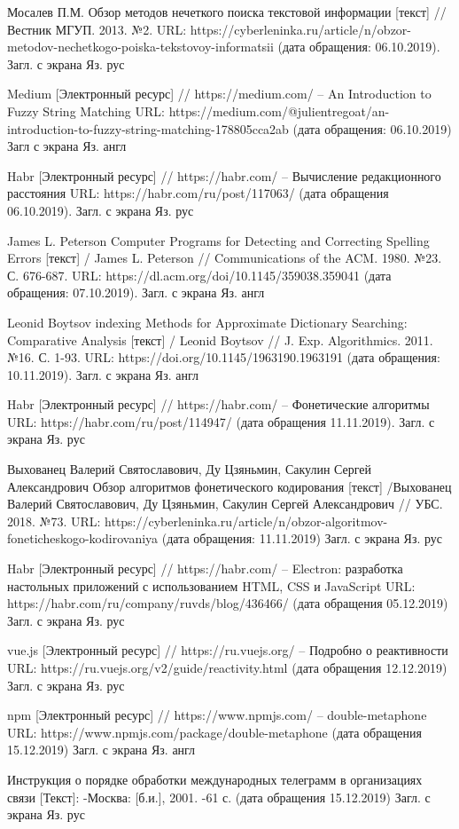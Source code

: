 \begin{thebibliography}{}

 Мосалев П.М. Обзор методов нечеткого поиска текстовой информации [текст] // Вестник МГУП. 2013. №2. URL: https://cyberleninka.ru/article/n/obzor-metodov-nechetkogo-poiska-tekstovoy-informatsii (дата обращения: 06.10.2019). Загл. с экрана Яз. рус

 Medium [Электронный ресурс] // https://medium.com/ -- An Introduction to Fuzzy String Matching URL: https://medium.com/@julientregoat/an-introduction-to-fuzzy-string-matching-178805cca2ab (дата обращения: 06.10.2019) Загл с экрана Яз. англ

 Habr [Электронный ресурс] // https://habr.com/ -- Вычисление редакционного расстояния URL:
https://habr.com/ru/post/117063/ (дата обращения 06.10.2019). Загл. с экрана Яз. рус

 James L. Peterson Computer Programs for Detecting and Correcting Spelling Errors [текст] / James L. Peterson // Communications of the ACM. 1980. №23. С. 676-687. URL: https://dl.acm.org/doi/10.1145/359038.359041 (дата обращения: 07.10.2019). Загл. с экрана Яз. англ

 Leonid Boytsov indexing Methods for Approximate Dictionary Searching: Comparative Analysis [текст] / Leonid Boytsov // J. Exp. Algorithmics. 2011. №16. С. 1-93. URL: https://doi.org/10.1145/1963190.1963191 (дата обращения: 10.11.2019). Загл. с экрана Яз. англ

 Habr [Электронный ресурс] // https://habr.com/ -- Фонетические алгоритмы URL: https://habr.com/ru/post/114947/ (дата обращения 11.11.2019). Загл. с экрана Яз. рус

 Выхованец Валерий Святославович, Ду Цзяньмин, Сакулин Сергей Александрович Обзор алгоритмов фонетического кодирования [текст] /Выхованец Валерий Святославович, Ду Цзяньмин, Сакулин Сергей Александрович // УБС. 2018. №73. URL: https://cyberleninka.ru/article/n/obzor-algoritmov-foneticheskogo-kodirovaniya (дата обращения: 11.11.2019) Загл. с экрана Яз. рус

 Habr [Электронный ресурс] // https://habr.com/ -- Electron: разработка настольных приложений с использованием HTML, CSS и JavaScript URL: https://habr.com/ru/company/ruvds/blog/436466/ (дата обращения 05.12.2019) Загл. с экрана Яз. рус

 vue.js [Электронный ресурс] // https://ru.vuejs.org/ -- Подробно о реактивности URL: https://ru.vuejs.org/v2/guide/reactivity.html (дата обращения 12.12.2019) Загл. с экрана Яз. рус

 npm [Электронный ресурс] // https://www.npmjs.com/ -- double-metaphone URL: https://www.npmjs.com/package/double-metaphone (дата обращения 15.12.2019) Загл. с экрана Яз. англ

 Инструкция о порядке обработки международных телеграмм в организациях связи [Текст]: -Москва: [б.и.], 2001. -61 с. (дата обращения 15.12.2019) Загл. с экрана Яз. рус
\end{thebibliography}
